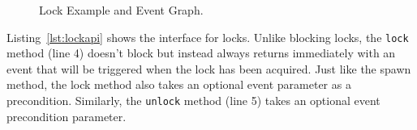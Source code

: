 \begin{figure}
{
}
\caption{Lock Example and Event Graph.\label{fig:lockevents}}
\vspace{-4mm}
\end{figure}

Listing~\ref{lst:lockapi} shows the 
interface for locks.  Unlike blocking locks, the {\tt lock} method (line 4) doesn't
block but instead always returns immediately with an event that will be triggered
when the lock has been acquired.  Just like the spawn method, the lock method also 
takes an optional event parameter as a precondition.  Similarly, the {\tt unlock} 
method (line 5) takes an optional event precondition parameter.

